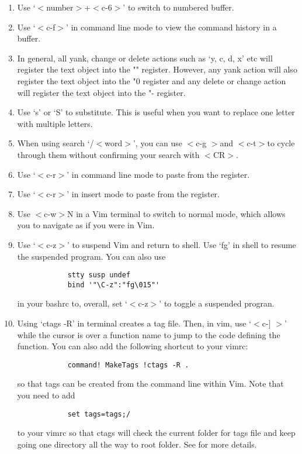 \documentclass[10pt]{article}
\newcommand{\tlangle}{$<$}
\newcommand{\trangle}{$>$}
\begin{document}
\begin{enumerate}
    \item Use `\tlangle number\trangle +\tlangle c-6\trangle' to switch to numbered buffer.
    \item Use `\tlangle c-f\trangle' in command line mode to view the command history in a
        buffer.
    \item In general, all yank, change or delete actions such as `y, c, d, x'
        etc will register the text object into the "" register. However, any
        yank action will also register the text object into the "0 register and
        any delete or change action will register the text object into the "-
        register.
    \item Use `s' or `S' to substitute. This is useful when you want to replace
        one letter with multiple letters.
    \item When using search `/\tlangle word\trangle', you can use \tlangle c-g
        \trangle and \tlangle c-t\trangle to cycle through them without
        confirming your search with \tlangle CR\trangle.
    \item Use `\tlangle c-r\trangle' in command line mode to paste from the
        register.
    \item Use `\tlangle c-r\trangle' in insert mode to paste from the register.
    \item Use \tlangle c-w\trangle N in a Vim terminal to switch to normal mode, which allows
        you to navigate as if you were in Vim.
    \item Use `\tlangle c-z\trangle' to suspend Vim and return to shell. Use `fg'
        in shell to resume the suspended program. You can also use
        \begin{lstlisting}
            stty susp undef
            bind '"\C-z":"fg\015"'
        \end{lstlisting}
        in your bashrc to, overall, set `\tlangle c-z\trangle' to toggle a
        suspended progran.
    \item Using `ctags -R' in terminal creates a tag file. Then, in vim, use
        `\tlangle c-$]$ \trangle' while the cursor is over a function name to
        jump to the code defining the function. You can also add the following
        shortcut to your vimrc:
        \begin{lstlisting}
            command! MakeTags !ctags -R .
        \end{lstlisting}
        so that tags can be created from the command line within Vim.
        Note that you need to add
        \begin{lstlisting}
            set tags=tags;/
        \end{lstlisting}
        to your vimrc so that ctags will check the current folder for tags file
        and keep going one directory all the way to root folder. See
        \cite{ben2011ctags} for more details.
\end{enumerate}
\end{document}
